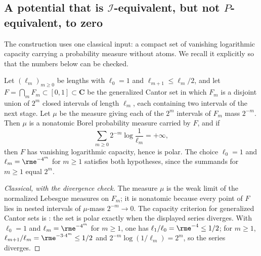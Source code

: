 \subsection{A potential that is
\texorpdfstring{\(\mathcal I\)}{I}-equivalent, but not
\texorpdfstring{\(P\)}{P}-equivalent, to zero}
\label{sec:ch51-cantor}

The construction uses one classical input: a compact set of vanishing
logarithmic capacity carrying a probability measure without atoms.  We
recall it explicitly so that the numbers below can be checked.

\begin{lemma}\label{lem:ch51-polar-cantor}
Let \((\ell_m)_{m\geq0}\) be lengths with \(\ell_0=1\) and
\(\ell_{m+1}\leq\ell_m/2\), and let
\(F=\bigcap_mF_m\subset[0,1]\subset\mathbf C\) be the generalized Cantor
set in which \(F_m\) is a disjoint union of \(2^m\) closed intervals of
length \(\ell_m\), each containing two intervals of the next stage.  Let
\(\mu\) be the measure giving each of the \(2^m\) intervals of \(F_m\)
mass \(2^{-m}\).  Then \(\mu\) is a nonatomic Borel probability measure
carried by \(F\), and if
\[
 \sum_{m\geq0}2^{-m}\log\frac{1}{\ell_m}=+\infty ,
\]
then \(F\) has vanishing logarithmic capacity, hence is polar.  The
choice \(\ell_0=1\) and \(\ell_m=\rme^{-4^m}\) for \(m\geq1\)
satisfies both hypotheses, since the summands for \(m\geq1\) equal \(2^m\).
\end{lemma}

\begin{proof}[Classical, with the divergence check]
The measure \(\mu\) is the weak limit of the normalized Lebesgue measures
on \(F_m\); it is nonatomic because every point of \(F\) lies in nested
intervals of \(\mu\)-mass \(2^{-m}\to0\).  The capacity criterion for
generalized Cantor sets is \cite[p.~31]{Car83}: the set is polar exactly
when the displayed series diverges.  With \(\ell_0=1\) and \(\ell_m=\rme^{-4^m}\) for \(m\geq1\),
one has \(\ell_1/\ell_0=\rme^{-4}\leq1/2\); for \(m\geq1\), \(\ell_{m+1}/\ell_m=\rme^{-3\cdot4^m}\leq1/2\) and
\(2^{-m}\log(1/\ell_m)=2^m\), so the series diverges.
\end{proof}

